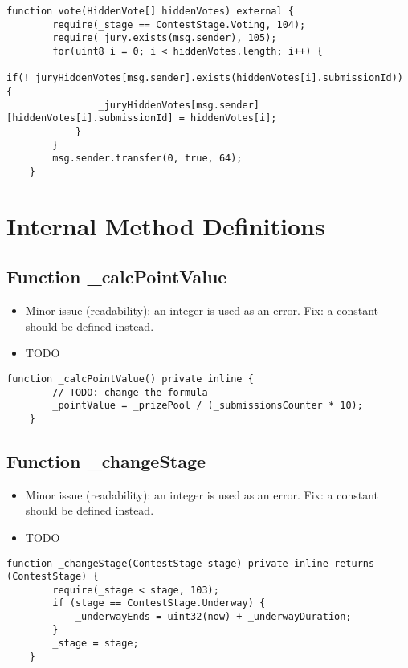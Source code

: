 \begin{lstlisting}[firstnumber=134]
    function vote(HiddenVote[] hiddenVotes) external {
        require(_stage == ContestStage.Voting, 104);
        require(_jury.exists(msg.sender), 105);
        for(uint8 i = 0; i < hiddenVotes.length; i++) {
            if(!_juryHiddenVotes[msg.sender].exists(hiddenVotes[i].submissionId)) {
                _juryHiddenVotes[msg.sender][hiddenVotes[i].submissionId] = hiddenVotes[i];
            }
        }
        msg.sender.transfer(0, true, 64);
    }
\end{lstlisting}

\section{Internal Method Definitions}


\subsection{Function \_{}calcPointValue}

\begin{itemize}
\item Minor issue (readability): an integer is used as an error. Fix:
  a constant should be defined instead.
\item TODO
\end{itemize}

\begin{lstlisting}[firstnumber=188]
    function _calcPointValue() private inline {
        // TODO: change the formula
        _pointValue = _prizePool / (_submissionsCounter * 10);
    }
\end{lstlisting}

\subsection{Function \_{}changeStage}

\begin{itemize}
\item Minor issue (readability): an integer is used as an error. Fix:
  a constant should be defined instead.
\item TODO
\end{itemize}

\begin{lstlisting}[firstnumber=106]
    function _changeStage(ContestStage stage) private inline returns (ContestStage) {
        require(_stage < stage, 103);
        if (stage == ContestStage.Underway) {
            _underwayEnds = uint32(now) + _underwayDuration;
        }
        _stage = stage;
    }
\end{lstlisting}

